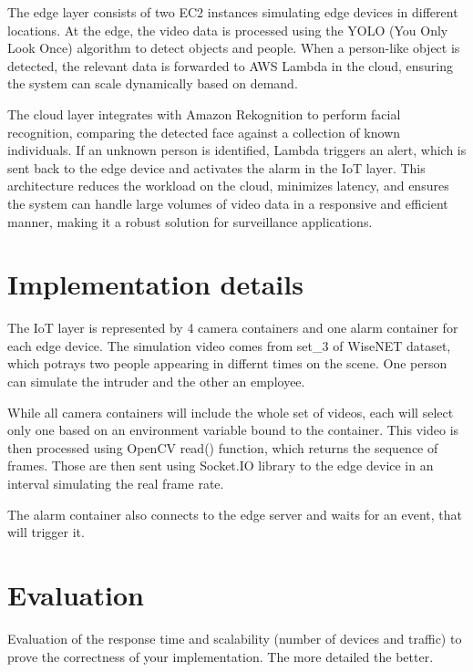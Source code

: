\documentclass[conference]{IEEEtran}
\begin{document}
The edge layer consists of two EC2 instances simulating edge devices in different locations. At the edge, the video data is processed using the YOLO (You Only Look Once) algorithm to detect objects and people. When a person-like object is detected, the relevant data is forwarded to AWS Lambda in the cloud, ensuring the system can scale dynamically based on demand.

The cloud layer integrates with Amazon Rekognition to perform facial recognition, comparing the detected face against a collection of known individuals. If an unknown person is identified, Lambda triggers an alert, which is sent back to the edge device and activates the alarm in the IoT layer. This architecture reduces the workload on the cloud, minimizes latency, and ensures the system can handle large volumes of video data in a responsive and efficient manner, making it a robust solution for surveillance applications.



\section{Implementation details}
The IoT layer is represented by 4 camera containers and one alarm container for each edge device. The simulation video comes from set\_3 of WiseNET dataset, which potrays two people appearing in differnt times on the scene. One person can simulate the intruder and the other an employee. 

While all camera containers will include the whole set of videos, each will select only one based on an environment variable bound to the container. This video is then processed using OpenCV read() function, which returns the sequence of frames. Those are then sent using Socket.IO library to the edge device in an interval simulating the real frame rate. 

The alarm container also connects to the edge server and waits for an event, that will trigger it.


\section{Evaluation}
Evaluation of the response time and scalability (number of devices and traffic) to prove the correctness of your implementation. The more detailed the better. 
\end{document}
